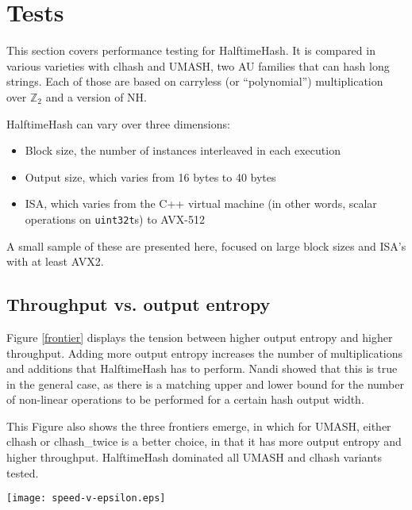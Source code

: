 \documentclass[sigconf, nonacm]{acmart}
\newcommand{\ints}{\mathbb{Z}}
\begin{document}

\section{Tests}

This section covers performance testing for HalftimeHash.
It is compared in various varieties with clhash and UMASH, two AU families that can hash long strings.
Each of those are based on carryless (or ``polynomial'') multiplication over $\ints_2$ and a version of NH.

HalftimeHash can vary over three dimensions:

\begin{itemize}
\item Block size, the number of instances interleaved in each execution
\item Output size, which varies from 16 bytes to 40 bytes
\item ISA, which varies from the C++ virtual machine (in other words, scalar operations on \texttt{uint32t}s) to AVX-512
\end{itemize}

A small sample of these are presented here, focused on large block sizes and ISA's with at least AVX2.

\subsection{Throughput vs. output entropy}

Figure \ref{frontier} displays the tension between higher output entropy and higher throughput.
Adding more output entropy increases the number of multiplications and additions that HalftimeHash has to perform.
Nandi showed that this is true in the general case, as there is a matching upper and lower bound for the number of non-linear operations to be performed for a certain hash output width.

This Figure also shows the three frontiers emerge, in which for UMASH, either clhash or clhash\_twice is a better choice, in that it has more output entropy and higher throughput.
HalftimeHash dominated all UMASH and clhash variants tested.

\texttt{[image: speed-v-epsilon.eps]}
\end{document}
